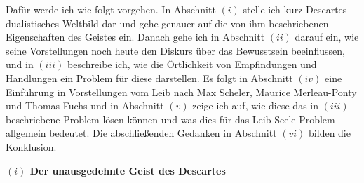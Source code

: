 \documentclass[a4paper, 12pt]{article}
\begin{document}
\begin{onehalfspace}
Dafür werde ich wie folgt vorgehen. In Abschnitt $(i)$ stelle ich kurz Descartes dualistisches Weltbild dar und gehe genauer auf die von ihm beschriebenen Eigenschaften des Geistes ein. Danach gehe ich in Abschnitt $(ii)$ darauf ein, wie seine Vorstellungen noch heute den Diskurs über das Bewusstsein beeinflussen, und in $(iii)$ beschreibe ich, wie die Örtlichkeit von Empfindungen und Handlungen ein Problem für diese darstellen. Es folgt in Abschnitt $(iv)$ eine Einführung in Vorstellungen vom Leib nach Max Scheler, Maurice Merleau-Ponty und Thomas Fuchs und in Abschnitt $(v)$ zeige ich auf, wie diese das in $(iii)$ beschriebene Problem lösen können und was dies für das Leib-Seele-Problem allgemein bedeutet. Die abschließenden Gedanken in Abschnitt $(vi)$ bilden die Konklusion.

\vspace{5mm}


\noindent\textbf{$(i)$ Der unausgedehnte Geist des Descartes}


\newpage

\end{onehalfspace}
\nocite{*}
\printbibliography
\end{document}
